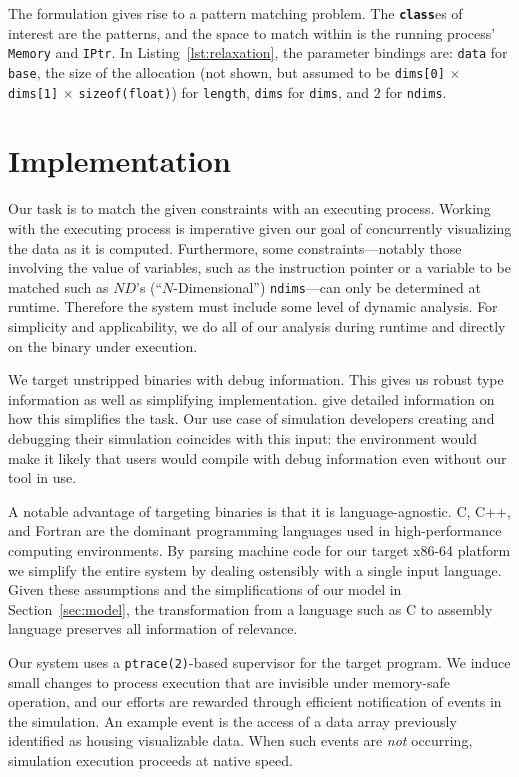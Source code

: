 The formulation gives rise to a pattern matching problem.  The
\texttt{\textbf{class}}es of interest are the patterns, and the space
to match within is the running process' \texttt{Memory} and
\texttt{IPtr}.  In Listing~\ref{lst:relaxation}, the parameter bindings are:
\texttt{data} for \texttt{base}, the size of the allocation (not shown, but
assumed to be \texttt{dims[0]} $\times$ \texttt{dims[1]} $\times$
\texttt{sizeof(float)}) for
\texttt{length}, \texttt{dims} for \texttt{dims}, and $2$ for
\texttt{ndims}.

\section{Implementation}

Our task is to match the given constraints with an executing process.
Working with the executing process is imperative given our goal of
concurrently visualizing the data as it is computed.  Furthermore, some
constraints---notably those involving the value of variables, such as
the instruction pointer or a variable to be matched such as $ND$'s
(``$N$-Dimensional'')
\texttt{ndims}---can only be determined at runtime.  Therefore the
system must include some level of dynamic analysis.  For simplicity and
applicability, we do all of our analysis during runtime and directly on
the binary under execution.

We target unstripped binaries with debug information.  This gives us
robust type information as well as simplifying implementation.
\cite{Reps:2010:Bottom} give detailed information on how this
simplifies the task. Our use case of simulation developers creating and
debugging their simulation coincides with this input: the environment
would make it likely that users would compile with debug information
even without our tool in use.

A notable advantage of targeting binaries is that it is
language-agnostic.  C, C++, and Fortran are the dominant programming
languages used in high-performance computing environments.  By parsing
machine code for our target x86-64 platform we simplify the entire
system by dealing ostensibly with a single input language.  %
Given these assumptions and the simplifications of our model in
Section~\ref{sec:model}, the transformation from a language such
as C to assembly language preserves all information of relevance.

Our system uses a \texttt{ptrace(2)}-based supervisor for the target
program.  We induce small changes to process execution that are
invisible under memory-safe operation, and our efforts are rewarded
through efficient notification of events in the simulation.  An example
event is the access of a data array previously identified as housing
visualizable data.
When such events are \emph{not} occurring, simulation execution
proceeds at native speed.

